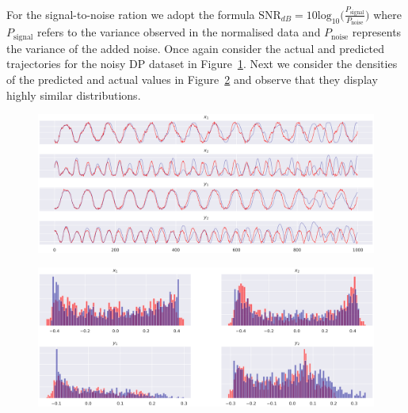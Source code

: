 For the signal-to-noise ration we adopt the formula $\text{SNR}_{dB}=10\text{log}_{10}\big(\frac{P_\text{{signal}}}{P_{\text{noise}}}\big)$ where $P_\text{{signal}}$ refers to the variance observed in the normalised data and $P_{\text{noise}}$ represents the variance of the added noise. 
Once again consider the actual and predicted trajectories for the noisy DP dataset in Figure~\ref{fig:noisydp_success_traj}. Next we consider the densities of the predicted and actual values in Figure~\ref{fig:noisydp_success_density} and observe that they display highly similar distributions.

\begin{figure}[ht]
  \centering
  \includegraphics[width=0.95\linewidth]{Graphs/_dp_noise_FigCD_2030.eps} 
 \label{fig:noisydp_success_traj}
\end{figure}
\begin{figure}[ht]
  \centering
  \includegraphics[width=\linewidth]{Graphs/_dp_noise_2B_2030.eps}
  \label{fig:noisydp_success_density}
 \end{figure}

